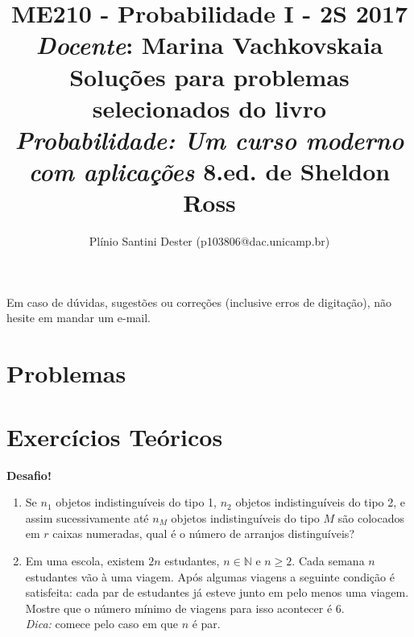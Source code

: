 


\title{	ME210 - Probabilidade I - 2S 2017\\
		{\large \textit{Docente}: Marina Vachkovskaia}\\[2mm]
		{\large Soluções para problemas selecionados do livro\\[-2mm]
        \textit{Probabilidade: Um curso moderno com aplicações}
        8.ed. de Sheldon Ross}\\
}
\author{Plínio Santini Dester (p103806@dac.unicamp.br)}



\maketitle

Em caso de dúvidas, sugestões ou correções (inclusive erros de digitação), não hesite em mandar um e-mail.

\section{Problemas}


\setcounter{section}{0}
\section{Exercícios Teóricos}


\vspace{3mm} {\LARGE \textbf{Desafio!}}
\begin{enumerate}
\item Se $n_1$ objetos indistinguíveis do tipo 1, $n_2$ objetos indistinguíveis do tipo 2, e assim sucessivamente até $n_M$ objetos indistinguíveis do tipo $M$ são colocados em $r$ caixas numeradas, qual é o número de arranjos distinguíveis? %
\item Em uma escola, existem $2n$ estudantes, $n\in\mathbb{N}$ e $n\geq2$. Cada semana $n$ estudantes vão à uma viagem. Após algumas viagens a seguinte condição é satisfeita: cada par de estudantes já esteve junto em pelo menos uma viagem. Mostre que o número mínimo de viagens para isso acontecer é 6.\\
\textit{Dica:} comece pelo caso em que $n$ é par.
\end{enumerate}

